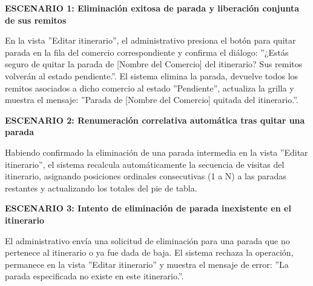 \documentclass[a4paper,9pt]{article}
\begin{document}
\begin{tcolorbox}[hucard, title={\textbf{HU-47: ELIMINAR PARADAS DE UN ITINERARIO} \hfill \scriptsize \colorbox{tealstatus}{\textbf{\ Accepted\ }} \quad \colorbox{white}{\textcolor{primarydark}{\textbf{\ 3 pts\ }}}}]
{\footnotesize
\noindent\textbf{\textcolor{secondarydark}{ESCENARIO 1:  Eliminación exitosa de parada y liberación conjunta de sus remitos}}\par\vspace{1pt}
En la vista ''Editar itinerario'', el administrativo presiona el botón para quitar parada en la fila del comercio correspondiente y confirma el diálogo: ''¿Estás seguro de quitar la parada de  [Nombre del Comercio]  del itinerario? Sus remitos volverán al estado pendiente.''. El sistema elimina la parada, devuelve todos los remitos asociados a dicho comercio al estado ''Pendiente'', actualiza la grilla y muestra el mensaje: ''Parada de  [Nombre del Comercio]  quitada del itinerario.''.\par\vspace{2.5pt}
\noindent\textbf{\textcolor{secondarydark}{ESCENARIO 2:  Renumeración correlativa automática tras quitar una parada}}\par\vspace{1pt}
Habiendo confirmado la eliminación de una parada intermedia en la vista ''Editar itinerario'', el sistema recalcula automáticamente la secuencia de visitas del itinerario, asignando posiciones ordinales consecutivas (1 a N) a las paradas restantes y actualizando los totales del pie de tabla.\par\vspace{2.5pt}
\noindent\textbf{\textcolor{secondarydark}{ESCENARIO 3:  Intento de eliminación de parada inexistente en el itinerario}}\par\vspace{1pt}
El administrativo envía una solicitud de eliminación para una parada que no pertenece al itinerario o ya fue dada de baja. El sistema rechaza la operación, permanece en la vista ''Editar itinerario'' y muestra el mensaje de error: ''La parada especificada no existe en este itinerario.''.\par\vspace{2.5pt}
}\par
\end{tcolorbox}
\end{document}
